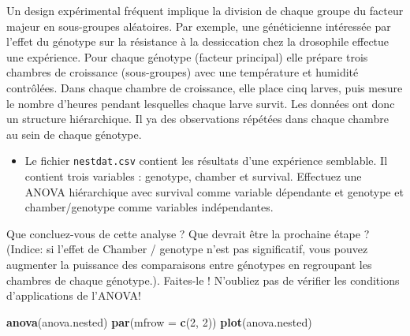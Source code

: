 \documentclass[12pt,]{book}
\newenvironment{Shaded}{\begin{snugshade}}{\end{snugshade}}
\newcommand{\DataTypeTok}[1]{\textcolor[rgb]{0.27,0.27,0.27}{#1}}
\newcommand{\DecValTok}[1]{\textcolor[rgb]{0.06,0.06,0.06}{#1}}
\newcommand{\KeywordTok}[1]{\textcolor[rgb]{0.27,0.27,0.27}{\textbf{#1}}}
\newcommand{\NormalTok}[1]{#1}
\newcommand{\OperatorTok}[1]{\textcolor[rgb]{0.43,0.43,0.43}{\textbf{#1}}}
\newcommand{\StringTok}[1]{\textcolor[rgb]{0.5,0.5,0.5}{#1}}
\providecommand{\tightlist}{%
  \setlength{\itemsep}{0pt}\setlength{\parskip}{0pt}}
\begin{document}
Un design expérimental fréquent implique la division de chaque groupe du facteur majeur en sous-groupes aléatoires. Par exemple, une généticienne intéressée par l'effet du génotype sur la résistance à la dessiccation chez la drosophile effectue une expérience. Pour chaque génotype (facteur principal) elle prépare trois chambres de croissance (sous-groupes) avec une température et humidité contrôlées. Dans chaque chambre de croissance, elle place cinq larves, puis mesure le nombre d'heures pendant lesquelles chaque larve survit. Les données ont donc un structure hiérarchique. Il ya des observations répétées dans chaque chambre au sein de chaque génotype.

\begin{itemize}
\tightlist
\item
  Le fichier \texttt{nestdat.csv} contient les résultats d'une expérience semblable. Il contient trois variables : genotype, chamber et survival. Effectuez une ANOVA hiérarchique avec survival comme variable dépendante et genotype et chamber/genotype comme variables indépendantes.
\end{itemize}

\begin{Shaded}
\end{Shaded}

Que concluez-vous de cette analyse ? Que devrait être la prochaine étape ? (Indice: si l'effet de Chamber / genotype n'est pas significatif, vous pouvez augmenter la puissance des comparaisons entre génotypes en regroupant les chambres de chaque génotype.). Faites-le ! N'oubliez pas de vérifier les conditions d'applications de l'ANOVA!

\iffalse

\begin{Shaded}
\begin{Highlighting}[]
\KeywordTok{anova}\NormalTok{(anova.nested)}
\KeywordTok{par}\NormalTok{(}\DataTypeTok{mfrow =} \KeywordTok{c}\NormalTok{(}\DecValTok{2}\NormalTok{, }\DecValTok{2}\NormalTok{))}
\KeywordTok{plot}\NormalTok{(anova.nested)}
\end{Highlighting}
\end{Shaded}
\end{document}

